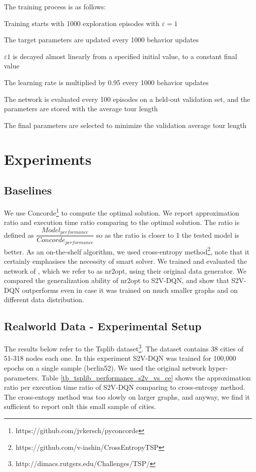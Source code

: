 \documentclass[10pt,a4paper,draft]{article}
\begin{document}
The training process is as follows:
\begin{list}{•}{•}
	\item Training starts with 1000 exploration episodes with $\varepsilon = 1$
	\item The target parameters are updated every 1000 behavior updates
	\item $\varepsilon1$ is decayed almost linearly from a specified initial value, to a constant final value
	\item The learning rate is multiplied by 0.95 every 1000 behavior updates
	\item The network is evaluated every 100 episodes on a held-out validation set, and the parameters are stored with the average tour length
	\item The final parameters are selected to minimize the validation average tour length
\end{list}

\section{Experiments} \label{sec-experiments}
\subsection{Baselines}	
We use Concorde\footnote{https://github.com/jvkersch/pyconcorde} to compute the optimal solution. We report approximation ratio and execution time ratio comparing to the optimal solution. The ratio is defined as $\dfrac{Model_{performance}}{Concorde_{performance}} $ so as the ratio is closer to 1 the tested model is better.
As an on-the-shelf algorithm, we used cross-entropy method\footnote{https://github.com/v-iashin/CrossEntropyTSP}, note that it certainly emphasises the necessity of smart solver.
We trained and evaluated the network of \cite{deudon18-tsp-nr2opt}, which we refer to as nr2opt, using their original data generator. We compared the generalization ability of nr2opt to S2V-DQN, and show that S2V-DQN outperforms \cite{deudon18-tsp-nr2opt} even in case it was trained on much smaller graphs and on different data distribution.

\subsection{Realworld Data - Experimental Setup} \label{realworld-exp}
The results below refer to the Tsplib dataset\footnote{http://dimacs.rutgers.edu/Challenges/TSP/}. The dataset contains 38 cities of 51-318 nodes each one.
In this experiment	S2V-DQN was trained for 100,000 epochs on a single sample (berlin52). We used the original network hyper-parameters.
Table \ref{tb_tsplib_performance_s2v_vs_ce} shows the approximation ratio per execution time ratio of S2V-DQN comparing to cross-entropy method. The cross-entopy method was too slowly on larger graphs, and anyway, we find it sufficient to report onlt this small sample of cities.
	
\end{document}
